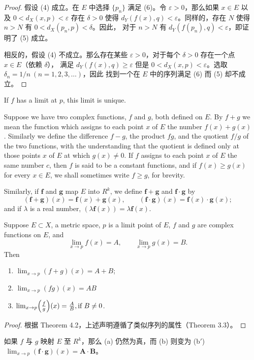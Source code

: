 \documentclass[../poma-notes.tex]{subfiles}
\begin{document}
\begin{proof}
  假设 (4) 成立。在 $E$ 中选择 $\{p_n\}$ 满足 (6)。令 $\varepsilon > 0$，那么如果 $x\in E$ 以及 $0<d_X(x,p)<\varepsilon$
  存在 $\delta > 0$ 使得 $d_Y(f(x),q)<\varepsilon$。同样的，存在 $N$ 使得 $n > N$ 有 $0<d_X(p_n,p)<\delta$。因此，
  对于 $n > N$ 有 $d_Y(f(p_n),q) < \varepsilon$，即证明了 (5) 成立。

  相反的，假设 (4) 不成立。那么存在某些 $\varepsilon > 0$，对于每个 $\delta > 0$ 存在一个点 $x \in E$（依赖 $\delta$），
  满足 $d_Y(f(x),q)\ge\varepsilon$ 但是 $0<d_X(x,p)<\varepsilon$。选取 $\delta_n = 1/n\ (n=1,2,3,\dots)$，因此
  找到一个在 $E$ 中的序列满足 (6) 而 (5) 却不成立。
\end{proof}

\begin{corollary}
  If $f$ has a limit at $p$, this limit is unique.
\end{corollary}

\begin{definition}
  Suppose we have two complex functions, $f$ and $g$, both defined on $E$. By $f + g$ we mean the function which
  assigns to each point $x$ of $E$ the number $f(x) + g(x)$. Similarly we define the difference $f - g$, the
  product $fg$, and the quotient $f/g$ of the two functions, with the understanding that the quotient is defined
  only at those points $x$ of $E$ at which $g(x) \ne 0$. If $f$ assigns to each point $x$ of $E$ the same number
  $c$, then $f$ is said to be a constant functions, and if $f(x) \ge g(x)$ for every $x \in E$, we shall sometimes
  write $f \ge g$, for brevity.

  Similarly, if $\pmb{f}$ and $\pmb{g}$ map $E$ into $R^k$, we define $\pmb{f}+\pmb{g}$ and $\pmb{f}\cdot\pmb{g}$
  by
  \[
    (\pmb{f}+\pmb{g})(x)=\pmb{f}(x)+\pmb{g}(x),\qquad (\pmb{f}\cdot\pmb{g})(x)=\pmb{f}(x)\cdot\pmb{g}(x);
  \]
  and if $\lambda$ is a real number, $(\lambda\pmb{f}(x))=\lambda\pmb{f}(x)$.
\end{definition}

\begin{theorem}
  Suppose $E \subset X$, a metric space, $p$ is a limit point of $E$, $f$ and $g$ are complex functions on $E$, and
  \[
    \lim_{x \to p} f(x) = A, \qquad \lim_{x \to p} g(x) = B.
  \]
  Then
  \begin{enumerate}[label=(\alph*)]
    \item $\lim_{x \to p} (f+g)(x) = A + B$;
    \item $\lim_{x \to p} (fg)(x) = AB$
    \item $\lim_{x \to p} \Bigl(\frac{f}{g}\Bigr)(x) = \frac{A}{B}, \text{if } B \ne 0$.
  \end{enumerate}
\end{theorem}

\begin{proof}
  根据 Theorem 4.2，上述声明遵循了类似序列的属性（Theorem 3.3）。
\end{proof}

\begin{remark*}
  如果 $f$ 与 $g$ 映射 $E$ 至 $R^k$，那么 (a) 仍然为真，而 (b) 则变为
  (b$'$) $\ \lim_{x \to p}(\pmb{f}\cdot\pmb{g})(x) = \pmb{A}\cdot\pmb{B}$。
\end{remark*}
\end{document}
